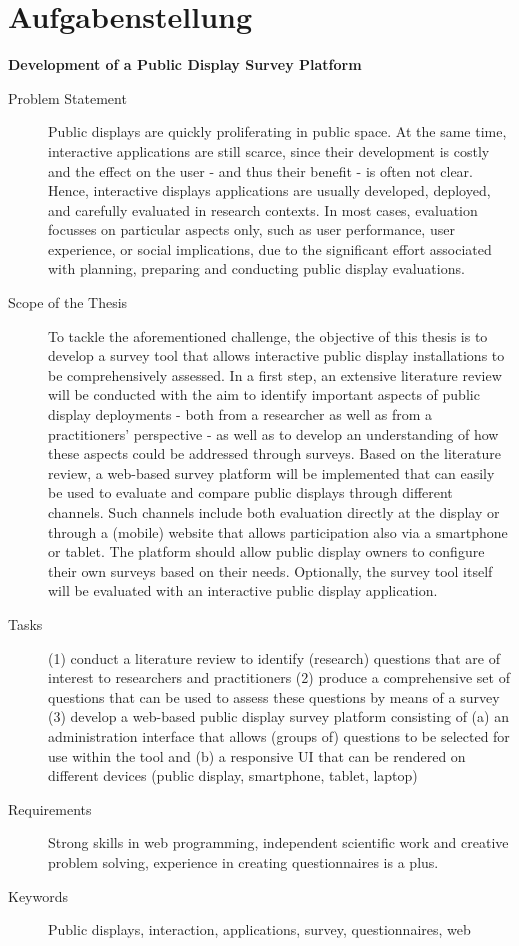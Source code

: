 \section*{Aufgabenstellung} %

\textbf{Development of a Public Display Survey Platform}

\begin{description}
    \item[Problem Statement] Public displays are quickly proliferating in public space. At the same time, interactive applications are still scarce, since their development is costly and the effect on the user - and thus their benefit - is often not clear. Hence, interactive displays applications are usually developed, deployed, and carefully evaluated in research contexts. In most cases, evaluation focusses on particular aspects only, such as user performance, user experience, or social implications, due to the significant effort associated with planning, preparing and conducting public display evaluations.
    \item[Scope of the Thesis] To tackle the aforementioned challenge, the objective of this thesis is to develop a survey tool that allows interactive public display installations to be comprehensively assessed. In a first step, an extensive literature review will be conducted with the aim to identify important aspects of public display deployments - both from a researcher as well as from a practitioners' perspective - as well as to develop an understanding of how these aspects could be addressed through surveys. Based on the literature review, a web-based survey platform will be implemented that can easily be used to evaluate and compare public displays through different channels. Such channels include both evaluation directly at the display or through a (mobile) website that allows participation also via a smartphone or tablet. The platform should allow public display owners to configure their own surveys based on their needs. Optionally, the survey tool itself will be evaluated with an interactive public display application.

    \item[Tasks] 
    (1) conduct a literature review to identify (research) questions that are of interest to researchers and practitioners \newline
(2) produce a comprehensive set of questions that can be used to assess these questions by means of a survey \newline
(3) develop a web-based public display survey platform consisting of (a) an administration interface that allows (groups of) questions to be selected for use within the tool and
(b) a responsive UI that can be rendered on different devices (public display, smartphone, tablet, laptop)

    \item[Requirements] Strong skills in web programming, independent scientific work and creative problem solving, experience in creating questionnaires is a plus.

    \item[Keywords] Public displays, interaction, applications, survey, questionnaires, web

\end{description}